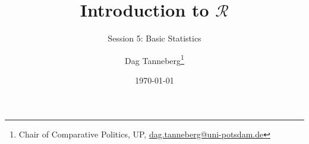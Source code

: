 \usepackage[utf8]{inputenc}
\usepackage{hyperref}
\usepackage{graphicx}
\usepackage{booktabs}

\title{Introduction to $\mathcal{R}$}
\subtitle{Session 5: Basic Statistics}
\author{Dag Tanneberg\thanks{%
  Chair of Comparative Politics, UP, %
  \href{mailto:dag.tanneberg@uni-potsdam.de}%
    {dag.tanneberg@uni-potsdam.de}
  }
}
\date{\today}

\hypersetup{colorlinks, urlcolor = red, linkcolor = }
